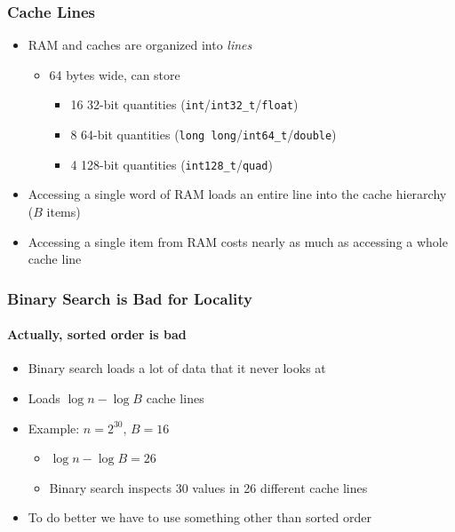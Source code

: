 \documentclass[xcolor=dvipsnames]{beamer}
\newcommand{\mi}[1]{\multiinclude[<+>][start=1,format=pdf]{#1}}
\begin{document}
\begin{frame}
   \frametitle{Cache Lines}

   \begin{itemize}
      \item<+-> RAM and caches are organized into \emph{lines}
      \begin{itemize}
        \item<+-> 64 bytes wide, can store
        \begin{itemize}
        \item<+-> 16 32-bit quantities (\texttt{int}/\texttt{int32_t}/\texttt{float})
        \item<+-> 8 64-bit quantities (\texttt{long long}/\texttt{int64_t}/\texttt{double})
        \item<+-> 4 128-bit quantities (\texttt{int128_t}/\texttt{quad})
        \end{itemize}
      \end{itemize}
      \item<+-> Accessing a single word of RAM loads an entire line
         into the cache hierarchy ($B$ items)
   \end{itemize}
   \begin{center}
   \end{center}
   \begin{itemize}
        \item<+->Accessing a single item from RAM costs nearly as much as accessing a whole cache line
   \end{itemize}
\end{frame}

\begin{frame}
   \frametitle{Binary Search is Bad for Locality}
   \framesubtitle{Actually, sorted order is bad}

   \begin{itemize}
      \item<+->Binary search loads a lot of data that it never looks at
   \end{itemize}
   \begin{center}
      \mi{figs/binary-search-bad}%
   \end{center}
   \begin{itemize}
      \item<13->Loads $\log n - \log B$ cache lines
      \item<14->Example: $n =2^{30}$, $B=16$
      \begin{itemize}
          \item<15->$\log n - \log B=26$
          \item<16->Binary search inspects 30 values in 26 different cache lines
      \end{itemize}
      \item<17->To do better we have to use something other than sorted order
   \end{itemize}
\end{frame}
\end{document}
